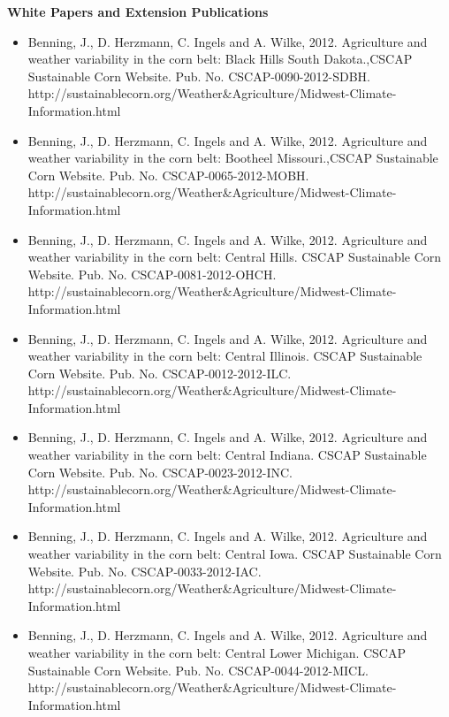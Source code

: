 \normalsize \sf
\normalsize \bf White Papers and Extension Publications
\normalsize \sf
\begin{itemize}
\item Benning, J., D. Herzmann, C. Ingels and A. Wilke, 2012. Agriculture and weather variability in the corn belt: Black Hills South Dakota.,CSCAP Sustainable Corn Website. Pub. No. CSCAP-0090-2012-SDBH. http://sustainablecorn.org/Weather\&Agriculture/Midwest-Climate-Information.html

\item Benning, J., D. Herzmann, C. Ingels and A. Wilke, 2012. Agriculture and weather variability in the corn belt: Bootheel Missouri.,CSCAP Sustainable Corn Website. Pub. No. CSCAP-0065-2012-MOBH. http://sustainablecorn.org/Weather\&Agriculture/Midwest-Climate-Information.html

\item Benning, J., D. Herzmann, C. Ingels and A. Wilke, 2012. Agriculture and weather variability in the corn belt: Central Hills. CSCAP Sustainable Corn Website. Pub. No. CSCAP-0081-2012-OHCH. http://sustainablecorn.org/Weather\&Agriculture/Midwest-Climate-Information.html

\item Benning, J., D. Herzmann, C. Ingels and A. Wilke, 2012. Agriculture and weather variability in the corn belt: Central Illinois. CSCAP Sustainable Corn Website. Pub. No. CSCAP-0012-2012-ILC. http://sustainablecorn.org/Weather\&Agriculture/Midwest-Climate-Information.html

\item Benning, J., D. Herzmann, C. Ingels and A. Wilke, 2012. Agriculture and weather variability in the corn belt: Central Indiana. CSCAP Sustainable Corn Website. Pub. No. CSCAP-0023-2012-INC. http://sustainablecorn.org/Weather\&Agriculture/Midwest-Climate-Information.html

\item Benning, J., D. Herzmann, C. Ingels and A. Wilke, 2012. Agriculture and weather variability in the corn belt: Central Iowa. CSCAP Sustainable Corn Website. Pub. No. CSCAP-0033-2012-IAC. http://sustainablecorn.org/Weather\&Agriculture/Midwest-Climate-Information.html

\item Benning, J., D. Herzmann, C. Ingels and A. Wilke, 2012. Agriculture and weather variability in the corn belt: Central Lower Michigan. CSCAP Sustainable Corn Website. Pub. No. CSCAP-0044-2012-MICL. http://sustainablecorn.org/Weather\&Agriculture/Midwest-Climate-Information.html


\end{itemize}
